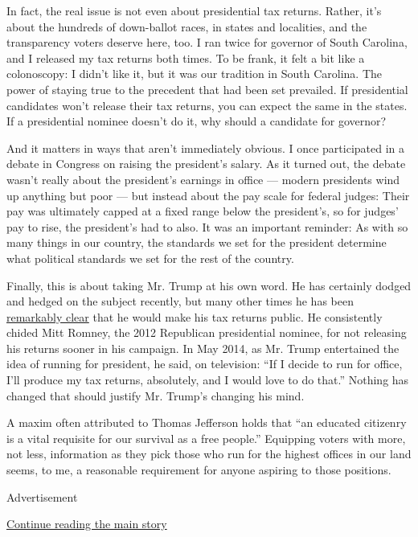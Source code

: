 In fact, the real issue is not even about presidential tax returns.
Rather, it's about the hundreds of down-ballot races, in states and
localities, and the transparency voters deserve here, too. I ran twice
for governor of South Carolina, and I released my tax returns both
times. To be frank, it felt a bit like a colonoscopy: I didn't like it,
but it was our tradition in South Carolina. The power of staying true to
the precedent that had been set prevailed. If presidential candidates
won't release their tax returns, you can expect the same in the states.
If a presidential nominee doesn't do it, why should a candidate for
governor?

And it matters in ways that aren't immediately obvious. I once
participated in a debate in Congress on raising the president's salary.
As it turned out, the debate wasn't really about the president's
earnings in office --- modern presidents wind up anything but poor ---
but instead about the pay scale for federal judges: Their pay was
ultimately capped at a fixed range below the president's, so for judges'
pay to rise, the president's had to also. It was an important reminder:
As with so many things in our country, the standards we set for the
president determine what political standards we set for the rest of the
country.

Finally, this is about taking Mr. Trump at his own word. He has
certainly dodged and hedged on the subject recently, but many other
times he has been
\href{http://www.nationalmemo.com/showusyourtaxes-heres-every-time-donald-trump-has-said-he-would-release-his-tax-returns/}{remarkably
clear} that he would make his tax returns public. He consistently chided
Mitt Romney, the 2012 Republican presidential nominee, for not releasing
his returns sooner in his campaign. In May 2014, as Mr. Trump
entertained the idea of running for president, he said, on television:
``If I decide to run for office, I'll produce my tax returns,
absolutely, and I would love to do that.'' Nothing has changed that
should justify Mr. Trump's changing his mind.

A maxim often attributed to Thomas Jefferson holds that ``an educated
citizenry is a vital requisite for our survival as a free people.''
Equipping voters with more, not less, information as they pick those who
run for the highest offices in our land seems, to me, a reasonable
requirement for anyone aspiring to those positions.

Advertisement

\protect\hyperlink{after-bottom}{Continue reading the main story}

